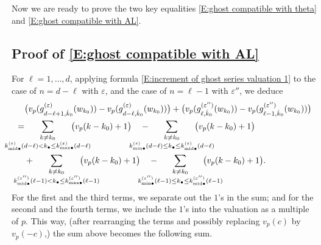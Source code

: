 \documentclass[12pt]{amsart}
\theoremstyle{definition}
\numberwithin{equation}{subsection}
\def\ZZ{\mathbb{Z}}
\newcommand{\midd}{\mathrm{mid}}
\begin{document}
Now we are ready to prove the two key equalities \eqref{E:ghost compatible with theta} and \eqref{E:ghost compatible with AL}.


\subsection{Proof of \eqref{E:ghost compatible with AL}}
\label{S:proof of ghost compatible with AL}
For $\ell = 1, \dots, d$, applying formula \eqref{E:increment of ghost series valuation 1} to the case of $n=d-\ell$ with $\varepsilon$, and the case of $n=\ell-1$ with $\varepsilon''$, we deduce 
\begin{align}
\label{E:ghost compatible with AL first step}
&\big(v_p(g_{d-\ell+1, \hat k_0}^{(\varepsilon)}(w_{k_0})) - v_p(g_{d-\ell, \hat k_0}^{(\varepsilon)}(w_{k_0}))\big) + \big(v_p(g_{\ell, \hat k_0}^{(\varepsilon'')}(w_{k_0})) - v_p(g_{\ell-1, \hat k_0}^{(\varepsilon'')}(w_{k_0}))\big)
\\
\nonumber
=&
\hspace{-25pt}
\sum_{\substack{k\neq k_0 \\
k^{(\varepsilon)}_{\midd\bullet}(d-\ell) < k_\bullet \leq k^{(\varepsilon)}_{{\max}\bullet}(d-\ell)}}
\hspace{-25pt}\big( v_p(k-k_0)+1 \big)\quad -  \hspace{-25pt} \sum_{\substack{k\neq k_0 \\
k^{(\varepsilon)}_{{\min}\bullet}(d-\ell) \leq  k_\bullet \leq k^{(\varepsilon)}_{{\midd}\bullet}(d-\ell)}}
\hspace{-25pt}\big( v_p(k-k_0)+1 \big)\\ \nonumber
&+
\hspace{-25pt}
\sum_{\substack{k\neq k_0 \\
k^{(\varepsilon'')}_{\midd\bullet}(\ell-1) < k_\bullet \leq k^{(\varepsilon'')}_{{\max}\bullet}(\ell-1)}}
\hspace{-25pt}\big( v_p(k-k_0)+1 \big)\quad -  \hspace{-25pt} \sum_{\substack{k\neq k_0 \\
k^{(\varepsilon'')}_{{\min}\bullet}(\ell-1) \leq k_\bullet \leq k^{(\varepsilon'')}_{{\midd}\bullet}(\ell-1)}}
\hspace{-25pt}\big( v_p(k-k_0)+1 \big).
\end{align}
For the first and the third terms, we separate out the $1$'s in the sum; and for the second and the fourth terms, we include the $1$'s into the valuation as a multiple of $p$. This way, (after rearranging the terms and possibly replacing $v_p(c)$ by $v_p(-c)$,) the sum above becomes the following sum.
\end{document}
